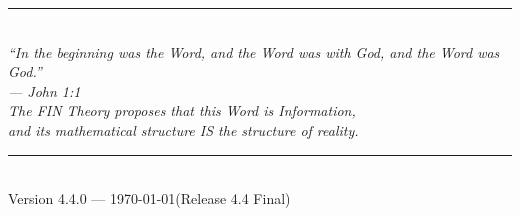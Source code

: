 \documentclass[11pt,a4paper]{book}
\theoremstyle{remark}
\begin{document}
\vspace{2cm}
\begin{center}
\rule{0.5\textwidth}{0.4pt}\\[0.5cm]
\textit{``In the beginning was the Word, and the Word was with God, and the Word was God.''}\\
\textit{--- John 1:1}\\[0.5cm]
\textit{The FIN Theory proposes that this Word is Information,}\\
\textit{and its mathematical structure IS the structure of reality.}\\[1cm]
\rule{0.5\textwidth}{0.4pt}\\[0.5cm]
Version 4.4.0 --- \today (Release 4.4 Final)
\end{center}
\end{document}
